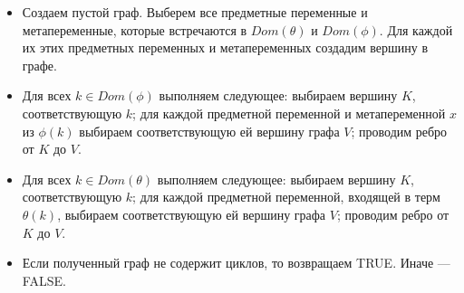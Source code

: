 \documentclass{cw1}
\begin{document}
\begin{itemize}
 \item Создаем пустой граф. Выберем все предметные переменные и метапеременные, которые встречаются
 в $Dom(\theta)$ и $Dom(\phi)$. Для каждой их этих предметных переменных и
 метапеременных создадим вершину в графе.
 \item Для всех  $k \in Dom(\phi)$  выполняем следующее:
 выбираем вершину $K$, соответствующую $k$;
 для каждой предметной переменной и метапеременной $x$ из $\phi(k)$ выбираем соответствующую
 ей вершину графа $V$; проводим ребро от $K$ до $V$.
 \item Для всех $k \in Dom(\theta)$ выполняем следующее:
 выбираем вершину $K$, соответствующую  $k$;
 для каждой предметной переменной, входящей в терм $\theta(k)$, выбираем соответствующую
 ей вершину графа $V$; проводим ребро от $K$ до $V$.
\item Если полученный граф не содержит циклов, то возвращаем TRUE. Иначе --- FALSE.
\end{itemize}
\end{document}
